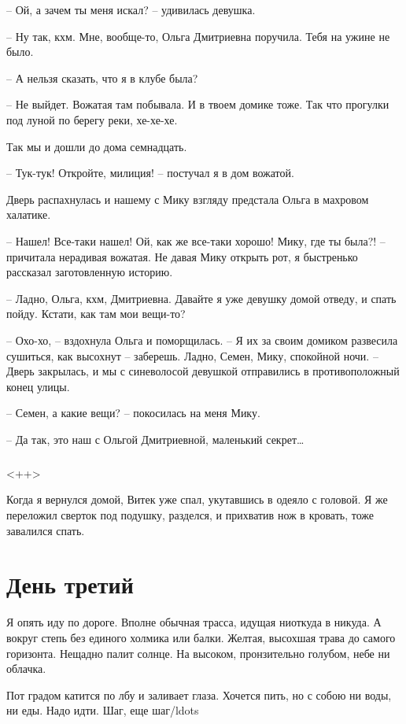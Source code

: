 \documentclass[a4paper]{book}
\begin{document}
-- Ой, а зачем ты меня искал? -- удивилась девушка.

-- Ну так, кхм. Мне, вообще-то, Ольга Дмитриевна поручила. Тебя на ужине не было.

-- А нельзя сказать, что я в клубе была?

-- Не выйдет. Вожатая там побывала. И в твоем домике тоже. Так что прогулки под луной по берегу реки, хе-хе-хе.

Так мы и дошли до дома семнадцать. 

-- Тук-тук! Откройте, милиция! -- постучал я в дом вожатой.

Дверь распахнулась и нашему с Мику взгляду предстала Ольга в махровом халатике. 

-- Нашел! Все-таки нашел! Ой, как же все-таки хорошо! Мику, где ты была?! -- причитала нерадивая вожатая. Не давая Мику открыть рот, я быстренько рассказал заготовленную историю. 

-- Ладно, Ольга, кхм, Дмитриевна. Давайте я уже девушку домой отведу, и спать пойду. Кстати, как там мои вещи-то?

-- Охо-хо, -- вздохнула Ольга и поморщилась. -- Я их за своим домиком развесила сушиться, как высохнут -- заберешь. Ладно, Семен, Мику, спокойной ночи. -- Дверь закрылась, и мы с синеволосой девушкой отправились в противоположный конец улицы.

-- Семен, а какие вещи? -- покосилась на меня Мику.

-- Да так, это наш с Ольгой Дмитриевной, маленький секрет\ldots

\paragraph{}<++>

Когда я вернулся домой, Витек уже спал, укутавшись в одеяло с головой. Я же переложил сверток под подушку, разделся, и прихватив нож в кровать, тоже завалился спать.


\chapter{День третий}

Я опять иду по дороге. Вполне обычная трасса, идущая ниоткуда в никуда. А вокруг степь без единого холмика или балки. Желтая, высохшая трава до самого горизонта. Нещадно палит солнце. На высоком, пронзительно голубом, небе ни облачка. 

Пот градом катится по лбу и заливает глаза. Хочется пить, но с собою ни воды, ни еды. Надо идти. Шаг, еще шаг/ldots  
\end{document}
